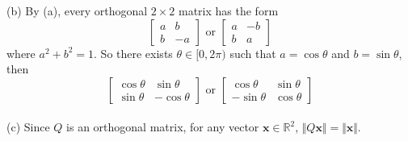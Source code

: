 (b) By (a), every orthogonal $2 \times 2$ matrix has the form \begin{equation*}
	\begin{bmatrix}
		a & b \\ b & -a
	\end{bmatrix} \mbox{ or } \begin{bmatrix}
		a & -b \\ b & a
	\end{bmatrix}
\end{equation*} where $a^2 + b^2 = 1$. So there exists $\theta \in [0, 2\pi)$ such that $a = \cos \theta$ and $b = \sin \theta$, then \begin{equation*}
	\begin{bmatrix}
	\cos \theta & \sin \theta \\ \sin \theta & -\cos \theta
	\end{bmatrix} \mbox{ or } \begin{bmatrix}
	\cos \theta & \sin \theta \\ -\sin \theta & \cos \theta
	\end{bmatrix}
\end{equation*}\\

(c) Since $Q$ is an orthogonal matrix, for any vector $\textbf{x} \in \mathbb{R}^2$, $\Vert Q\textbf{x} \Vert = \Vert \textbf{x} \Vert$. \\

